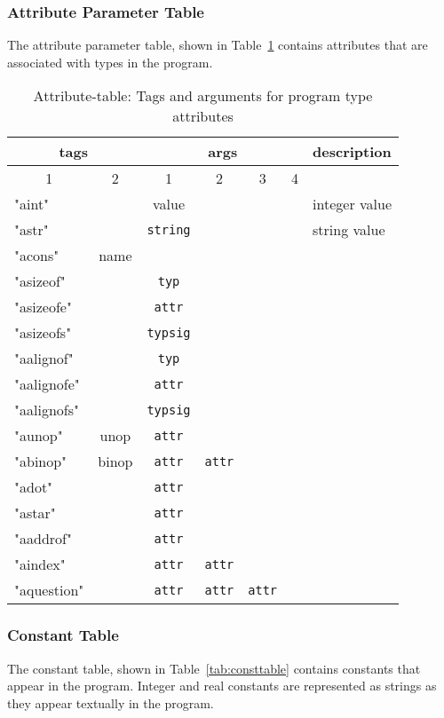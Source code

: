 \documentclass[11pt]{article}
\begin{document}
\subsubsection{Attribute Parameter Table}

The attribute parameter table, shown in Table~\ref{tab:attrtable} contains attributes 
that are associated with types in the program.

\begin{table}
\centering
\begin{tabular}{l|c||c|c|c|c||l}
\multicolumn{2}{c||}{tags} & \multicolumn{4}{|c||}{args} & description \\ \hline
\multicolumn{1}{c|}{1} & 2 & 1 & 2 & 3 & 4 & \\ \hline 
"aint" & & value & & & & integer value \\
"astr" & & {\tt string} & & & & string value \\
"acons" & name & & & & & \\
"asizeof" & & {\tt typ} & & & & \\
"asizeofe" & & {\tt attr} & & & & \\
"asizeofs" & & {\tt typsig} & & & & \\
"aalignof" & & {\tt typ} & & & & \\
"aalignofe" & & {\tt attr} & & & & \\
"aalignofs" & & {\tt typsig} & & & & \\
"aunop" & unop & {\tt attr} & & & & \\
"abinop" & binop & {\tt attr} & {\tt attr} & & & \\
"adot" & & {\tt attr} & & & & \\
"astar" & & {\tt attr} & & & & \\
"aaddrof" & & {\tt attr} & & & & \\
"aindex" & & {\tt attr} & {\tt attr} & & & \\
"aquestion" & & {\tt attr} & {\tt attr} & {\tt attr} & & \\ \hline
\end{tabular}
\caption{\label{tab:attrtable}Attribute-table: Tags and arguments for program type attributes}
\end{table}



\subsubsection{Constant Table}

The constant table, shown in Table~\ref{tab:consttable} contains constants that 
appear in the program. Integer and 
real constants are represented as strings as they appear textually in the program.
\end{document}
